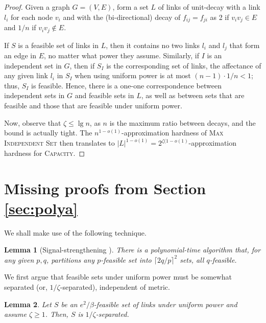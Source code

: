 \documentclass[11pt]{amsart}
\newtheorem{lemma}{Lemma}[section]
\newcommand{\prob}[1]{\textsc{#1}}
\newcommand{\Capacity}{\prob{Capacity}}
\newcommand{\capacity}{\Capacity}
\begin{document}
\begin{proof}
Given a graph $G=(V,E)$, form a set $L$ of links of unit-decay with a
link $l_i$ for each node $v_i$ and with the (bi-directional) decay of
$f_{ij} = f_{ji}$ as 2 if $v_iv_j \in E$ and $1/n$ if $v_iv_j \not\in
E$.

If $S$ is a feasible set of links in $L$, then it contains no two
links $l_i$ and $l_j$ that form an edge in $E$, no matter what
power they assume.  Similarly, if $I$ is an independent set in $G$,
then if $S_I$ is the corresponding set of links, the affectance of any
given link $l_i$ in $S_I$ when using uniform power is at most $(n-1) \cdot
1/n < 1$; thus, $S_I$ is feasible.  Hence, there is a one-one
correspondence between independent sets in $G$ and feasible sets in
$L$, as well as between sets that are feasible and those that are feasible
under uniform power.

Now, observe that $\zeta \le \lg n$, as $n$ is the maximum ratio
between decays, and the bound is actually tight.  The
$n^{1-o(1)}$-approximation hardness of \prob{Max Independent Set}
\cite{khot2006better} then translates to $|L|^{1-o(1)} =
2^{\zeta(1-o(1)}$-approximation hardness for {\capacity}.
\end{proof}


\section{Missing proofs from Section \ref{sec:polya}}

We shall make use of the following technique.

\begin{lemma}[Signal-strengthening \cite{HW09}]
There is a polynomial-time algorithm that, for any given $p, q$, 
partitions any $p$-feasible set into 
$\lceil 2q/p \rceil^2$ sets, all $q$-feasible.
\label{lem:signal-strength}
\end{lemma}

We first argue that feasible sets under uniform power must be somewhat separated (or, $1/\zeta$-separated), independent of metric.

\begin{lemma}
Let $S$ be an $e^2/\beta$-feasible set of links under uniform power and assume
$\zeta \ge 1$.
Then, $S$ is $1/\zeta$-separated.
\label{lem:onezetasep}
\end{lemma}
\end{document}
